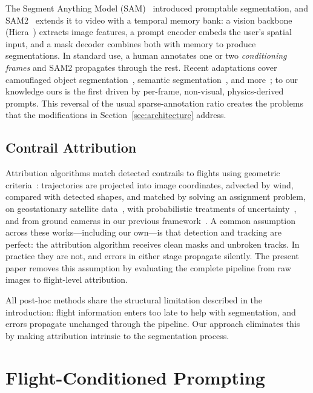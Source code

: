\documentclass[1p,11pt]{elsarticle}
\begin{document}
The Segment Anything Model (SAM)~\cite{kirillov2023sam} introduced promptable segmentation, and SAM2~\cite{ravi2024sam2} extends it to video with a temporal memory bank: a vision backbone (Hiera~\cite{ryali2023hiera}) extracts image features, a prompt encoder embeds the user's spatial input, and a mask decoder combines both with memory to produce segmentations. In standard use, a human annotates one or two \emph{conditioning frames} and SAM2 propagates through the rest. Recent adaptations cover camouflaged object segmentation~\cite{zhou2024sam2cos}, semantic segmentation~\cite{hesham2025sam2vss}, and more~\cite{zhang2025sam2survey}; to our knowledge ours is the first driven by per-frame, non-visual, physics-derived prompts. This reversal of the usual sparse-annotation ratio creates the problems that the modifications in Section~\ref{sec:architecture} address.

\subsection{Contrail Attribution}

Attribution algorithms match detected contrails to flights using geometric criteria~\cite{chevallier2023linear, riggi2023ai, geraedts2024scalable, dalmau2025attribution}: trajectories are projected into image coordinates, advected by wind, compared with detected shapes, and matched by solving an assignment problem, on geostationary satellite data~\cite{chevallier2023linear, geraedts2024scalable}, with probabilistic treatments of uncertainty~\cite{riggi2023ai}, and from ground cameras in our previous framework~\cite{dalmau2025attribution}. A common assumption across these works---including our own---is that detection and tracking are perfect: the attribution algorithm receives clean masks and unbroken tracks. In practice they are not, and errors in either stage propagate silently. The present paper removes this assumption by evaluating the complete pipeline from raw images to flight-level attribution.

All post-hoc methods share the structural limitation described in the introduction: flight information enters too late to help with segmentation, and errors propagate unchanged through the pipeline. Our approach eliminates this by making attribution intrinsic to the segmentation process.

\section{Flight-Conditioned Prompting}
\label{sec:prompting}
\end{document}
